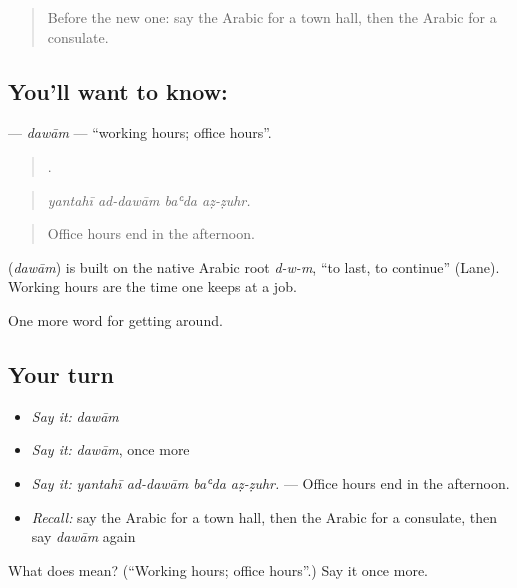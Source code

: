 \begin{quote}
Before the new one: say the Arabic for a town hall, then the Arabic for a consulate.
\end{quote}

\subsection*{You'll want to know: }
\textbf{} — \emph{dawām} — \textquotedblleft{}working hours; office hours\textquotedblright{}.

\begin{quote}
   .
\end{quote}

\begin{quote}
\emph{yantahī ad-dawām baʿda aẓ-ẓuhr.}
\end{quote}

\begin{quote}
Office hours end in the afternoon.
\end{quote}

\begin{cousinweb}
\textbf{} (\emph{dawām}) is built on the native Arabic root \emph{d-w-m}, \textquotedblleft{}to last, to continue\textquotedblright{} (Lane). Working hours are the time one keeps at a job.
\end{cousinweb}

\begin{grammarlens}[title={What you've built}]
One more word for getting around.
\end{grammarlens}

\subsection*{Your turn}
\begin{itemize}
\raggedright
  \item \emph{Say it:} \emph{dawām}
  \item \emph{Say it:} \emph{dawām}, once more
  \item \emph{Say it:} \emph{yantahī ad-dawām baʿda aẓ-ẓuhr.} — Office hours end in the afternoon.
  \item \emph{Recall:} say the Arabic for a town hall, then the Arabic for a consulate, then say \emph{dawām} again
\end{itemize}

\begin{tcolorbox}[breakable,colback=teal!4,colframe=teal!35!black,title={Before you move on}]
What does  mean? (\textquotedblleft{}Working hours; office hours\textquotedblright{}.) Say it once more.
\end{tcolorbox}
